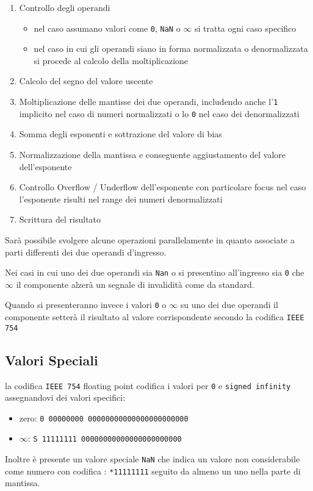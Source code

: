 \documentclass[twoside,11pt]{article}
\begin{document}
\begin{enumerate}[noitemsep]
    \item Controllo degli operandi
          \begin{itemize}[noitemsep]
              \item nel caso assumano valori come \verb|0|, \verb|NaN| o $\infty$ si tratta ogni caso specifico
              \item nel caso in cui gli operandi siano in forma normalizzata o denormalizzata si procede al calcolo della moltiplicazione
          \end{itemize}
    \item Calcolo del segno del valore uscente
    \item Moltiplicazione delle mantisse dei due operandi, includendo anche l’\verb|1| implicito nel caso di numeri normalizzati o lo \verb|0| nel caso dei denormalizzati
    \item Somma degli esponenti e sottrazione del valore di bias
    \item Normalizzazione della mantissa e conseguente aggiustamento del valore dell'esponente
    \item Controllo Overflow / Underflow dell'esponente con particolare focus nel caso l’esponente risulti nel range dei numeri denormalizzati
    \item Scrittura del risultato
\end{enumerate}

Sarà possibile svolgere alcune operazioni parallelamente in quanto associate a parti differenti dei due operandi d’ingresso.

Nei casi in cui uno dei due operandi sia \verb|Nan| o si presentino all'ingresso sia \verb|0| che $\infty$ il componente alzerà un segnale di invalidità come da standard.

Quando si presenteranno invece i valori \verb|0| o $\infty$ su uno dei due operandi il componente setterà il risultato al valore corrispondente secondo la codifica \verb|IEEE 754|

\subsection{Valori Speciali}
la codifica \verb|IEEE 754| floating point codifica i valori per \verb|0| e \verb|signed infinity| assegnandovi dei valori specifici:
\begin{itemize}[noitemsep]
    \item zero: \verb|0 00000000 00000000000000000000000|
    \item $\infty$: \verb|S 11111111 00000000000000000000000|
\end{itemize}
Inoltre è presente un valore speciale \verb|NaN| che indica un valore non considerabile come numero con codifica : \verb|*11111111| seguito da almeno un uno nella parte di mantissa.
\end{document}
